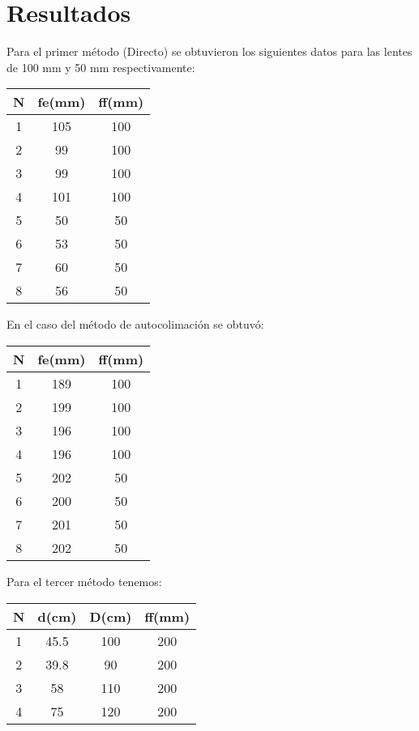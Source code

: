 \documentclass[10pt,journal]{IEEEtran}
\begin{document}
\section{Resultados}




Para el primer método (Directo) se obtuvieron los siguientes datos para las lentes de 100 mm y 50 mm respectivamente:
\begin{center}
\begin{tabular}{|c|c|c|}
\hline
N & fe(mm) & ff(mm) \\
\hline
1 & 105 & 100\\
\hline
2 & 99 & 100\\
\hline
3 & 99 & 100\\
\hline
4 & 101 & 100\\
\hline
5 & 50 & 50\\
\hline
6 & 53 & 50\\
\hline
7 & 60 & 50\\
\hline
8 & 56 & 50\\
\hline
\end{tabular}
\end{center}

En  el caso del método de autocolimación se obtuvó:

\begin{center}
\begin{tabular}{|c|c|c|}
\hline
N & fe(mm) & ff(mm) \\
\hline
1 & 189 & 100\\
\hline
2 & 199 & 100\\
\hline
3 & 196 & 100\\
\hline
4 & 196 & 100\\
\hline
5 & 202 & 50\\
\hline
6 & 200 & 50\\
\hline
7 & 201 & 50\\
\hline
8 & 202 & 50\\
\hline
\end{tabular}
\end{center}


Para el tercer método tenemos:

\begin{center}
\begin{tabular}{|c|c|c|c|}
\hline
N & d(cm) & D(cm) & ff(mm) \\
\hline
1 & 45.5 & 100 & 200 \\
\hline
2 & 39.8 & 90 & 200 \\
\hline
3 & 58 & 110 & 200\\
\hline
4 & 75 & 120 & 200\\
\hline
\end{tabular}
\end{center}
\end{document}

